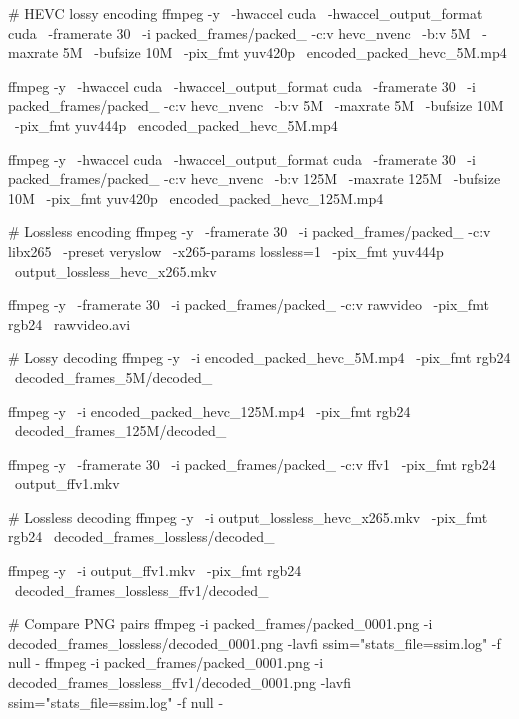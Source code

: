 # HEVC lossy encoding
ffmpeg -y \
  -hwaccel cuda \
  -hwaccel_output_format cuda \
  -framerate 30 \
  -i packed_frames/packed_%
  -c:v hevc_nvenc \
  -b:v 5M \
  -maxrate 5M \
  -bufsize 10M \
  -pix_fmt yuv420p \
  encoded_packed_hevc_5M.mp4

  ffmpeg -y \
  -hwaccel cuda \
  -hwaccel_output_format cuda \
  -framerate 30 \
  -i packed_frames/packed_%
  -c:v hevc_nvenc \
  -b:v 5M \
  -maxrate 5M \
  -bufsize 10M \
  -pix_fmt yuv444p \
  encoded_packed_hevc_5M.mp4

  ffmpeg -y \
  -hwaccel cuda \
  -hwaccel_output_format cuda \
  -framerate 30 \
  -i packed_frames/packed_%
  -c:v hevc_nvenc \
  -b:v 125M \
  -maxrate 125M \
  -bufsize 10M \
  -pix_fmt yuv420p \
  encoded_packed_hevc_125M.mp4


# Lossless encoding
ffmpeg -y \
  -framerate 30 \
  -i packed_frames/packed_%
  -c:v libx265 \
  -preset veryslow \
  -x265-params lossless=1 \
  -pix_fmt yuv444p \
  output_lossless_hevc_x265.mkv

  ffmpeg -y \
  -framerate 30 \
  -i packed_frames/packed_%
  -c:v rawvideo \
  -pix_fmt rgb24 \
  rawvideo.avi

# Lossy decoding
  ffmpeg -y \
  -i encoded_packed_hevc_5M.mp4 \
  -pix_fmt rgb24 \
  decoded_frames_5M/decoded_%

  ffmpeg -y \
  -i encoded_packed_hevc_125M.mp4 \
  -pix_fmt rgb24 \
  decoded_frames_125M/decoded_%

  ffmpeg -y \
  -framerate 30 \
  -i packed_frames/packed_%
  -c:v ffv1 \
  -pix_fmt rgb24 \
  output_ffv1.mkv

# Lossless decoding
ffmpeg -y \
  -i output_lossless_hevc_x265.mkv \
  -pix_fmt rgb24 \
  decoded_frames_lossless/decoded_%

  ffmpeg -y \
  -i output_ffv1.mkv \
  -pix_fmt rgb24 \
  decoded_frames_lossless_ffv1/decoded_%

# Compare PNG pairs
ffmpeg -i packed_frames/packed_0001.png -i decoded_frames_lossless/decoded_0001.png        -lavfi ssim="stats_file=ssim.log" -f null -
ffmpeg -i packed_frames/packed_0001.png -i decoded_frames_lossless_ffv1/decoded_0001.png        -lavfi ssim="stats_file=ssim.log" -f null -